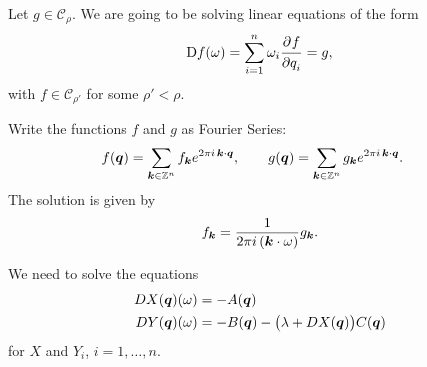 \documentclass[twoside,letterpaper,10pt]{article}
\begin{document}
Let $g \in \mathcal{C}_\rho$.
We are going to be solving linear equations of the form
\begin{equation*}
  \mathop{}\!\mathrm{D} f(\omega) = \sum_{i = 1}^n \omega_i \frac{\strut\partial^{}f}{\strut\partial q_i^{}} = g,
\end{equation*}
with $f \in \mathcal{C}_{\rho'}$ for some $\rho' < \rho$.

Write the functions $f$ and $g$ as Fourier Series:
\begin{align*}
  f(\bm{q}) &= \sum_{\bm{k} \in \mathbb{Z}^n} f_{\bm{k}} e^{2 \pi i \, \bm{k} \cdot
    \bm{q}},\qquad g(\bm{q}) = \sum_{\bm{k} \in \mathbb{Z}^n} g_{\bm{k}} e^{2 \pi i \,
              \bm{k} \cdot \bm{q}}.
\end{align*}
The solution is given by
\begin{equation*}
  f_{\bm{k}} = \frac{1}{2 \pi i \, (\bm{k} \cdot \omega)} g_{\bm{k}}.
\end{equation*}

We need to solve the equations
\begin{align*}
  DX(\bm{q})(\omega) &= -A(\bm{q})\\
  DY(\bm{q})(\omega) &= -B(\bm{q}) - \big( \lambda + DX(\bm{q}) \big)
              C(\bm{q})
\end{align*}
for $X$ and $Y_i$, $i = 1, \ldots, n$.
\end{document}

